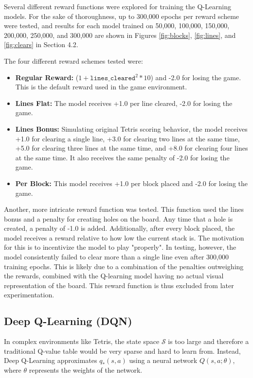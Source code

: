 \documentclass[12pt]{article}
\begin{document}
Several different reward functions were explored for training the Q-Learning models. For the sake of thoroughness, up to 300,000 epochs per reward scheme were tested, 
and results for each model trained on 50,000, 100,000, 150,000, 200,000, 250,000, and 300,000 are shown in Figures \ref{fig:blocks}, \ref{fig:lines}, and \ref{fig:clears} in Section 4.2.

The four different reward schemes tested were:
\begin{itemize}
    \item \textbf{Regular Reward: } ($1+ \texttt{lines\_cleared}^2 * 10$) and -2.0 for losing the game. This is the default reward used in the game environment.
    \item \textbf{Lines Flat:} The model receives +1.0 per line cleared, -2.0 for losing the game.
    \item \textbf{Lines Bonus:} Simulating original Tetris scoring behavior, the model receives +1.0 for clearing a single line, +3.0 for clearing two lines at the same time, +5.0 for clearing three lines at the same time, and +8.0 for clearing four lines at the same time. It also receives the same penalty of -2.0 for losing the game.
    \item \textbf{Per Block:} This model receives +1.0 per block placed and -2.0 for losing the game.
\end{itemize}
Another, more intricate reward function was tested. This function used the lines bonus and a penalty for creating holes on the board. 
Any time that a hole is created, a penalty of -1.0 is added. Additionally, after every block placed, the model receives a reward relative to how low the current stack is. 
The motivation for this is to incentivize the model to play "properly". In testing, however, the model consistently failed to clear more than a single line even after 300,000 training epochs.
This is likely due to a combination of the penalties outweighing the rewards, combined with the Q-learning model having no actual visual representation of the board. This reward function is thus excluded from later experimentation.


\subsection{Deep Q-Learning (DQN)}

In complex environments like Tetris, the state space $\mathcal{S}$ is too large and therefore a traditional Q-value table would be very sparse and hard to learn from. Instead, Deep Q-Learning approximates $q_*(s,a)$ using a neural network $Q(s, a; \theta)$, where $\theta$ represents the weights of the network.
\end{document}
